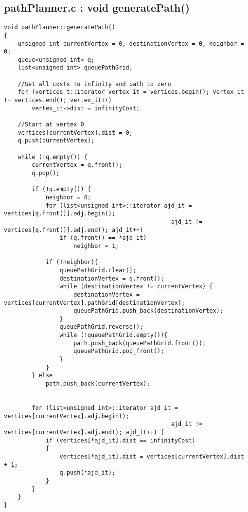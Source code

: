 \subsection{pathPlanner.c : void generatePath()}
\label{app:generatePath}
\begin{minipage}{\linewidth}
\begin{lstlisting}
void pathPlanner::generatePath()
{
    unsigned int currentVertex = 0, destinationVertex = 0, neighbor = 0;
    queue<unsigned int> q;
    list<unsigned int> queuePathGrid;

    //Set all costs to infinity and path to zero
    for (vertices_t::iterator vertex_it = vertices.begin(); vertex_it != vertices.end(); vertex_it++)
        vertex_it->dist = infinityCost;

    //Start at vertex 0
    vertices[currentVertex].dist = 0;
    q.push(currentVertex);

    while (!q.empty()) {
        currentVertex = q.front();
        q.pop();

        if (!q.empty()) {
            neighbor = 0;
            for (list<unsigned int>::iterator ajd_it = vertices[q.front()].adj.begin();
            									ajd_it != vertices[q.front()].adj.end(); ajd_it++)
                if (q.front() == *ajd_it)
                    neighbor = 1;

            if (!neighbor){
                queuePathGrid.clear();
                destinationVertex = q.front();
                while (destinationVertex != currentVertex) {
                    destinationVertex = vertices[currentVertex].pathGrid[destinationVertex];
                    queuePathGrid.push_back(destinationVertex);
                }
                queuePathGrid.reverse();
                while (!queuePathGrid.empty()){
                    path.push_back(queuePathGrid.front());
                    queuePathGrid.pop_front();
                }
            }
        } else
            path.push_back(currentVertex);


        for (list<unsigned int>::iterator ajd_it = vertices[currentVertex].adj.begin(); 
        										ajd_it != vertices[currentVertex].adj.end(); ajd_it++) {
            if (vertices[*ajd_it].dist == infinityCost)
            {
                vertices[*ajd_it].dist = vertices[currentVertex].dist + 1;
                q.push(*ajd_it);
            }
        }
    }
}
\end{lstlisting}~\\
\end{minipage}
